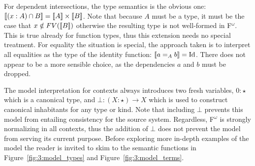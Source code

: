 For dependent intersections, the type semantics is the obvious one: $\llbracket (x : A) \cap B \rrbracket = \llbracket A \rrbracket \times \llbracket B \rrbracket$.
Note that because $A$ must be a type, it must be the case that $x \notin FV(\llbracket B \rrbracket)$ otherwise the resulting type is not well-formed in F$^\omega$.
This is true already for function types, thus this extension needs no special treatment.
For equality the situation is special, the approach taken is to interpret all equalities as the type of the identity function: $\llbracket a =_A b \rrbracket = \text{Id}$.
There does not appear to be a more sensible choice, as the dependencies $a$ and $b$ must be dropped.



The model interpretation for contexts always introduces two fresh variables, $0 : \star$ which is a canonical type, and $\bot : (X : \star) \to X$ which is used to construct canonical inhabitants for any type or kind.
Note that including $\bot$ prevents this model from entailing consistency for the source system.
Regardless, F$^\omega$ is strongly normalizing in all contexts, thus the addition of $\bot$ does not prevent the model from serving its current purpose.
Before exploring more in-depth examples of the model the reader is invited to skim to the semantic functions in Figure~\ref{fig:3:model_types} and Figure~\ref{fig:3:model_terms}.

